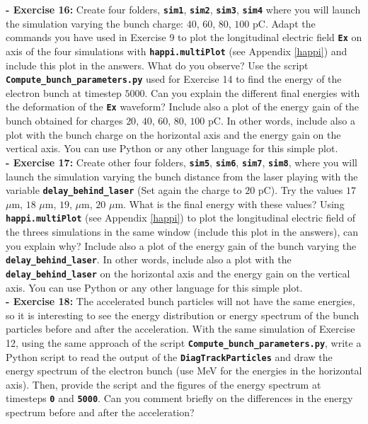 \documentclass[a4paper,12pt]{extarticle}
\newcommand{\commandline}[1]{\texttt{\textbf{#1}}}
\begin{document}
\textbf{ - Exercise 16:} Create four folders, \commandline{sim1}, \commandline{sim2}, \commandline{sim3}, \commandline{sim4} where you will launch the simulation varying the bunch charge: $40$, $60$, $80$, $100$ pC. Adapt the commands you have used in Exercise 9 to plot the longitudinal electric field \commandline{Ex} on axis of the four simulations with \commandline{happi.multiPlot} (see Appendix \ref{happi}) and include this plot in the answers. What do you observe? Use the script \commandline{Compute\_bunch\_parameters.py} used for Exercise 14 to find the energy of the electron bunch at timestep $5000$. Can you explain the different final energies with the deformation of the \commandline{Ex} waveform? Include also a plot of the energy gain of the bunch obtained for charges $20$, $40$, $60$, $80$, $100$ pC. In other words, include also a plot with the bunch charge on the horizontal axis and the energy gain on the vertical axis. You can use Python or any other language for this simple plot.\\

\textbf{ - Exercise 17:} Create other four folders, \commandline{sim5}, \commandline{sim6}, \commandline{sim7},  \commandline{sim8}, where you will launch the simulation varying the bunch distance from the laser playing with the variable \commandline{delay\_behind\_laser} (Set again the charge to $20$ pC). Try the values $17$ $\mu$m, $18$ $\mu$m, $19$, $\mu$m, $20$ $\mu$m. What is the final energy with these values? Using \commandline{happi.multiPlot} (see Appendix \ref{happi}) to plot the longitudinal electric field of the threes simulations in the same window (include this plot in the answers), can you explain why? Include also a plot of the energy gain of the bunch varying the \commandline{delay\_behind\_laser}. In other words, include also a plot with the \commandline{delay\_behind\_laser} on the horizontal axis and the energy gain on the vertical axis. You can use Python or any other language for this simple plot.\\

\textbf{- Exercise 18:} The accelerated bunch particles will not have the same energies, so it is interesting to see the energy distribution or energy spectrum of the bunch particles before and after the acceleration. With the same simulation of Exercise 12,  using the same approach of the script \commandline{Compute\_bunch\_parameters.py}, write a Python script to read the output of the \commandline{DiagTrackParticles} and draw the energy spectrum of the electron bunch (use MeV for the energies in the horizontal axis). Then, provide the script and the figures of the energy spectrum at timesteps \commandline{0} and \commandline{5000}.  Can you comment briefly on the differences in the energy spectrum before and after the acceleration?
\end{document}
